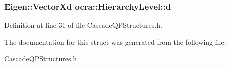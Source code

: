 \subsubsection[{\texorpdfstring{d}{d}}]{\setlength{\rightskip}{0pt plus 5cm}Eigen\+::\+Vector\+Xd ocra\+::\+Hierarchy\+Level\+::d}\hypertarget{structocra_1_1HierarchyLevel_ad1c6f525af33862743514fd5cf3e8c76}{}\label{structocra_1_1HierarchyLevel_ad1c6f525af33862743514fd5cf3e8c76}


Definition at line 31 of file Cascade\+Q\+P\+Structures.\+h.



The documentation for this struct was generated from the following file\+:\begin{DoxyCompactItemize}
\item 
\hyperlink{CascadeQPStructures_8h}{Cascade\+Q\+P\+Structures.\+h}\end{DoxyCompactItemize}
